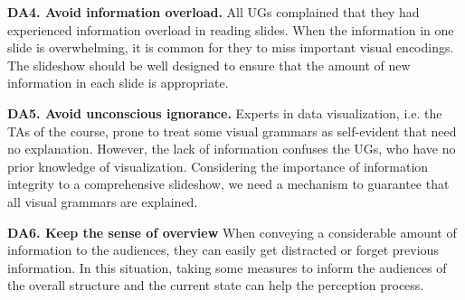 \textbf{DA4. Avoid information overload.} 
All UGs complained that they had experienced information overload in reading slides. 
When the information in one slide is overwhelming, it is common for they to miss important visual encodings. 
The slideshow should be well designed to ensure that the amount of new information in each slide is appropriate. 

\textbf{DA5. Avoid unconscious ignorance.}
Experts in data visualization, i.e. the TAs of the course, prone to treat some visual grammars as self-evident that need no  explanation. However, the lack of information confuses the UGs, who have no prior knowledge of visualization. 
Considering the importance of information integrity to a comprehensive slideshow, we need a mechanism to guarantee that all visual grammars are explained. 

\textbf{DA6. Keep the sense of overview}
When conveying a considerable amount of information to the audiences, they can easily get distracted or forget previous information. In this situation, taking some measures to inform the audiences of the overall structure and the current state can help the perception process. 
